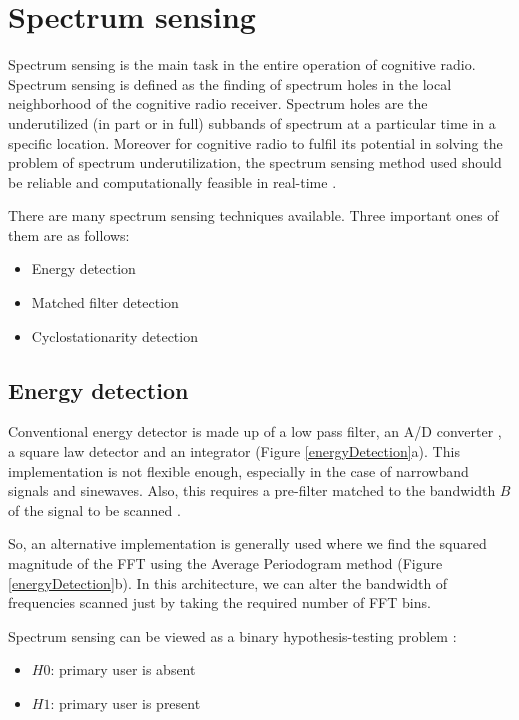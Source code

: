 \chapter{Spectrum sensing}

Spectrum sensing is the main task in the entire operation of cognitive
radio. Spectrum sensing is defined as the finding of spectrum holes in 
the local neighborhood of the cognitive radio receiver. Spectrum holes are the
underutilized (in part or in full) subbands of spectrum at a particular time
in a specific location. Moreover for cognitive radio to fulfil its potential
in solving the problem of spectrum underutilization, the spectrum sensing 
method used should be reliable and computationally feasible in real-time 
\cite{haykin09}.

There are many spectrum sensing techniques available. Three important ones of
them are as follows:
\begin{itemize}
    \item Energy detection
    \item Matched filter detection
    \item Cyclostationarity detection
\end{itemize}

\section{Energy detection}

Conventional energy detector is made up of a low pass filter, an A/D converter
, a square law detector and an integrator (Figure \ref{energyDetection}a).
This implementation is not flexible
enough, especially in the case of narrowband signals and sinewaves. Also, this
requires a pre-filter matched to the bandwidth $B$ of the signal to be 
scanned \cite{cabric06}.

So, an alternative implementation is generally used where we find the squared 
magnitude of the FFT using the Average Periodogram method (Figure 
\ref{energyDetection}b). In this 
architecture, we can alter the bandwidth of frequencies scanned just by taking
the required number of FFT bins. 

Spectrum sensing can be viewed as a binary hypothesis-testing problem 
\cite{zhang09}:
\begin{itemize}
    \item $H0$: primary user is absent
    \item $H1$: primary user is present
\end{itemize}

